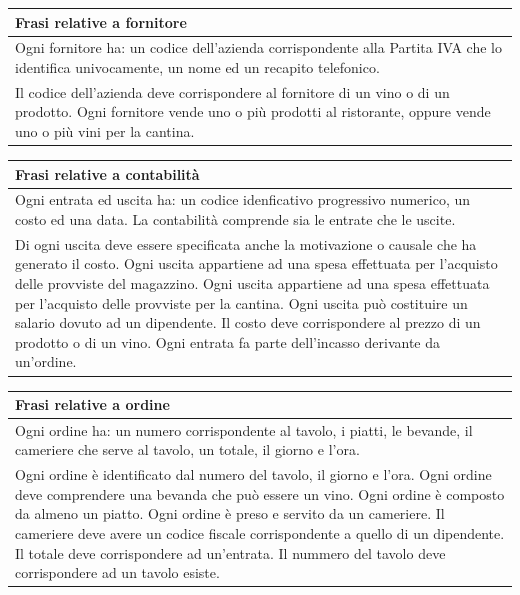 \begin{longtable}{|p{15.5cm}|}
    \hline
    \textbf{Frasi relative a fornitore} \\ \hline
    Ogni fornitore ha: un codice dell'azienda corrispondente alla Partita IVA che lo identifica univocamente, un nome ed un recapito telefonico.\\
    Il codice dell’azienda deve corrispondere al fornitore di un vino o di un prodotto.
Ogni fornitore vende uno o più prodotti al ristorante, oppure vende uno o più vini per la
cantina.
    \\ \hline
\end{longtable}

\begin{longtable}{|p{15.5cm}|}
    \hline
    \textbf{Frasi relative a contabilità} \\ \hline
    Ogni entrata ed uscita ha: un codice idenficativo progressivo numerico, un costo ed una data.
    La contabilità comprende sia le entrate che le uscite.\\
Di ogni uscita deve essere specificata anche la motivazione o causale che ha generato
il costo. 
Ogni uscita appartiene ad una spesa effettuata per l’acquisto delle provviste del magazzino.
Ogni uscita appartiene ad una spesa effettuata per l’acquisto delle provviste per la
cantina.
Ogni uscita può costituire un salario dovuto ad un dipendente.
Il costo deve corrispondere al prezzo di un prodotto o di un vino.
Ogni entrata fa parte dell’incasso derivante da un’ordine.
    \\ \hline
\end{longtable}

\begin{longtable}{|p{15.5cm}|}
    \hline
    \textbf{Frasi relative a ordine} \\ \hline
    Ogni ordine ha: un numero corrispondente al tavolo, i piatti, le bevande, il cameriere che serve al tavolo, un totale, il giorno e l'ora. \\
Ogni ordine è identificato dal numero del tavolo, il giorno e l'ora. 
Ogni ordine deve comprendere una bevanda che può essere un vino. 
Ogni ordine è composto da almeno un piatto.  
Ogni ordine è preso e servito da un cameriere. 
Il cameriere deve avere un codice fiscale corrispondente a quello di un dipendente. 
Il totale deve corrispondere ad un'entrata. 
Il nummero del tavolo deve corrispondere ad un tavolo esiste.
    \\ \hline
\end{longtable}

